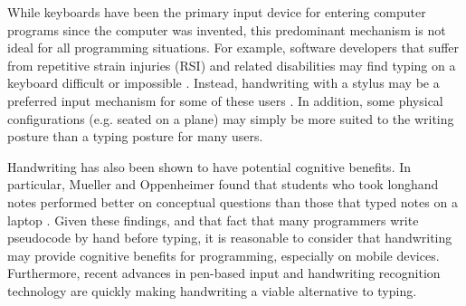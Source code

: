 \documentclass{vgtc}                          %
\begin{document}
While keyboards have been the primary input device for entering computer programs since the computer was invented\cite{gordon2013improving}, this predominant mechanism is not ideal for all programming situations. For example, software developers that suffer from repetitive strain injuries (RSI) and related disabilities may find typing on a keyboard difficult or impossible \cite{begelprogramming}.
Instead, handwriting with a stylus may be a preferred input mechanism for some of these users \cite{mankoff1998cirrin}.
In addition, some physical configurations (e.g. seated on a plane) may simply be more suited to the writing posture than a typing posture for many users.

Handwriting has also been shown to have potential cognitive benefits\cite{alonso2015metacognition}.  In particular, Mueller and Oppenheimer found that students who took longhand notes performed better on conceptual questions than those that typed notes on a laptop \cite{mueller2014pen}.  Given these findings, and that fact that many programmers write pseudocode by hand before typing, it is reasonable to consider that handwriting may provide cognitive benefits for programming, especially on mobile devices. 
Furthermore, recent advances in pen-based input and handwriting recognition technology are quickly making handwriting a viable alternative to typing.
\end{document}
